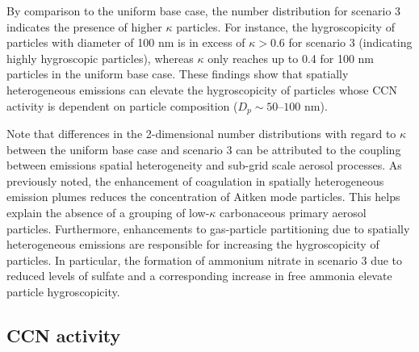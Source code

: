 \documentclass[journal abbreviation, manuscript]{copernicus}
\begin{document}
By comparison to the uniform base case, the number distribution for scenario 3 indicates the presence of higher $\kappa$ particles. For instance, the hygroscopicity of particles with diameter of 100 nm is in excess of $\kappa>0.6$ for scenario 3 (indicating highly hygroscopic particles), whereas $\kappa$ only reaches up to 0.4 for 100 nm particles in the uniform base case. These findings show that spatially heterogeneous emissions can elevate the hygroscopicity of particles whose CCN activity is dependent on particle composition ($D_p\sim50\text{--}100$ nm).  

Note that differences in the 2-dimensional number distributions with regard to $\kappa$ between the uniform base case and scenario 3 can be attributed to the coupling between emissions spatial heterogeneity and sub-grid scale aerosol processes. As previously noted, the enhancement of coagulation in spatially heterogeneous emission plumes reduces the concentration of Aitken mode particles. This helps explain the absence of a grouping of low-$\kappa$ carbonaceous primary aerosol particles. Furthermore, enhancements to gas-particle partitioning due to spatially heterogeneous emissions are responsible for increasing the hygroscopicity of particles. In particular, the formation of ammonium nitrate in scenario 3 due to reduced levels of sulfate and a corresponding increase in free ammonia elevate particle hygroscopicity. 


\subsection{CCN activity}\label{sec:ccn-activ}
\end{document}
